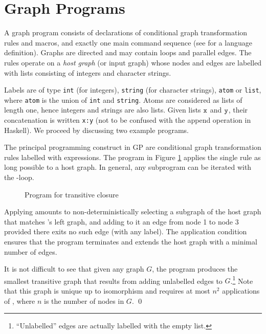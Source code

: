 \section{Graph Programs}
\label{sec:graph-programs}

A graph program consists of declarations of conditional graph transformation rules and macros, and exactly one main command sequence (see \cite{Plump12a} for a language definition). Graphs are directed and may contain  loops and parallel edges. The rules operate on a \emph{host graph}\/ (or input graph) whose nodes and edges are labelled with lists consisting of integers and character strings.

Labels are of type \texttt{int} (for integers), \texttt{string} (for character strings), \texttt{atom} or \texttt{list}, where \texttt{atom} is the union of \texttt{int} and \texttt{string}. Atoms are considered as lists of length one, hence integers and strings are also lists. Given lists $\mathtt{x}$ and $\mathtt{y}$, their concatenation is written \texttt{x:y} (not to be confused with the append operation in Haskell). 
We proceed by discussing two example programs.

\begin{example}
The principal programming construct in GP are conditional graph transformation rules labelled with expressions. The program in Figure \ref{fig:transitive-closure} applies the single rule  as long possible to a host graph. In general, any subprogram can be iterated with the \ttt{!}-loop.

\begin{figure}[htb]
\begin{center}
 
\end{center}
\caption{Program for transitive closure}\label{fig:transitive-closure}
\end{figure}

Applying  amounts to non-deterministically selecting a subgraph of the host graph that matches 's left graph, and adding to it an edge from node 1 to node 3 provided there exits no such edge (with any label). The application condition ensures that the program terminates and extends the host graph with a minimal number of edges.

It is not difficult to see that given any graph $G$, the program produces the smallest transitive graph that results from adding unlabelled edges to $G$.\footnote{``Unlabelled'' edges are actually labelled with the empty list.} Note that this graph is unique up to isomorphism and requires at most $n^2$ applications of , where $n$\/ is the number of nodes in $G$. \qed
\end{example}
  

